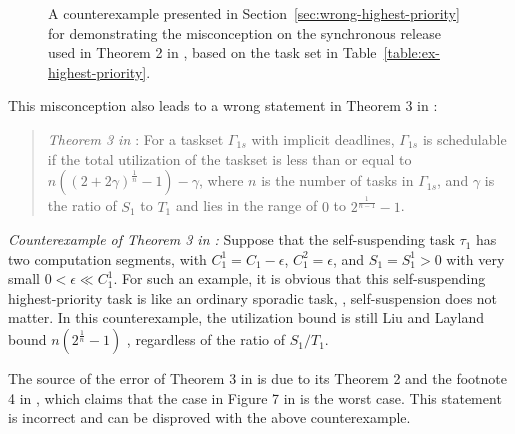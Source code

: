 \begin{figure}[t]
{}     
  \caption{A counterexample presented in Section~\ref{sec:wrong-highest-priority} for demonstrating the misconception on the synchronous release used in Theorem 2 in \cite{RTSS-KimANR13}, based on the task set in Table~\ref{table:ex-highest-priority}.}
  \label{fig:counterexample-reduce-interf}
\end{figure}

This misconception also leads to a wrong statement in Theorem 3 in \cite{RTSS-KimANR13}:
\begin{quote}
{\it Theorem 3 in \cite{RTSS-KimANR13}}: For a taskset $\Gamma_{1s}$ with implicit deadlines, $\Gamma_{1s}$ is schedulable if the total utilization of the taskset is less than or equal to $n((2+2\gamma)^{\frac{1}{n}}-1)-\gamma$, where $n$ is the number of tasks in $\Gamma_{1s}$, and $\gamma$ is the ratio of
$S_1$ to $T_1$ and lies in the range of $0$ to $2^{\frac{1}{n-1}}-1$. 
\end{quote}


{\it Counterexample of Theorem 3 in \cite{RTSS-KimANR13}:} Suppose that the self-suspending task $\tau_1$ has two computation segments, with $C_1^1 = C_1-\epsilon$, $C_1^2 = \epsilon$, and $S_1=S_1^1 > 0$ with very small $0 < \epsilon \ll C_1^1$. For such an example, it is obvious that this self-suspending highest-priority task is like an ordinary sporadic task, \ie, self-suspension does not matter. 
 In this counterexample, the utilization bound is still Liu and Layland bound $n(2^{\frac{1}{n}}-1)$ \cite{Liu_1973}, regardless of the ratio of $S_1/T_1$. 

The source of the error of Theorem 3 in \cite{RTSS-KimANR13} is due to its Theorem 2 and the footnote 4 in \cite{RTSS-KimANR13}, which claims that the case in Figure 7 in \cite{RTSS-KimANR13} is the worst case. This statement is incorrect and can be disproved with the above counterexample. 


